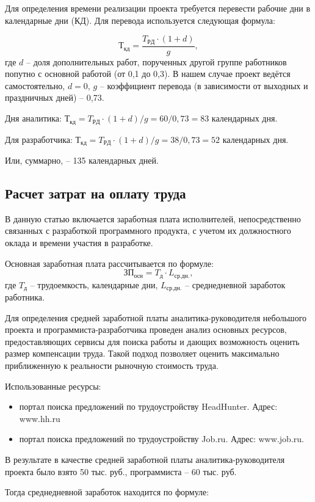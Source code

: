 Для определения времени реализации проекта требуется перевести рабочие дни в календарные дни (КД). Для перевода используется следующая формула:

$$Т_{кд}=\frac{T_{РД} \cdot (1+d) }{g},$$
где $d$ – доля дополнительных работ, порученных другой группе работников попутно с основной работой (от 0,1 до 0,3). В нашем случае проект ведётся самостоятельно, $d = 0$, $g$ – коэффициент перевода (в зависимости от выходных и праздничных дней) – 0,73.

Дня аналитика: $Т_{кд}={T_{РД} \cdot (1+d) }/{g} = 60/0,73 = 83 $ календарных дня.

Для разработчика: $Т_{кд}={T_{РД} \cdot (1+d) }/{g} = 38/0,73 = 52 $ календарных дня.

Или, суммарно, – 135 календарных дней.

\subsection{Расчет затрат на оплату труда}

В данную статью включается заработная плата исполнителей, непосредственно связанных с разработкой программного продукта, с учетом их должностного оклада и времени участия в разработке. 

Основная заработная плата рассчитывается по формуле:
$$ЗП_{осн}=T_{д} \cdot L_{ср.дн.},$$
где $T_{д}$ – трудоемкость, календарные дни, $L_{ср.дн.}$ – среднедневной заработок работника. 

Для определения средней заработной платы аналитика-руководителя небольшого проекта и программиста-разработчика проведен анализ основных ресурсов, предоставляющих сервисы для поиска работы и дающих возможность оценить размер компенсации труда. Такой подход позволяет оценить максимально приближенную к реальности рыночную стоимость труда.

Использованные ресурсы:
\begin{itemize}
	\item портал поиска предложений по трудоустройству HeadHunter. Адрес: www.hh.ru
	\item портал поиска предложений по трудоустройству Job.ru. Адрес: www.job.ru.
\end{itemize}

В результате в качестве средней заработной платы аналитика-руководителя проекта было взято 50 тыс. руб., программиста – 60 тыс. руб.

Тогда среднедневной заработок находится по формуле:

